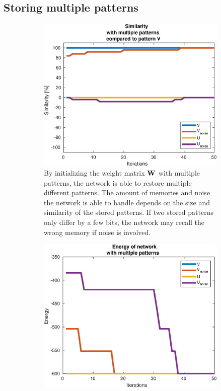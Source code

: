 \subsection{Storing multiple patterns}
\begin{figure}[H]
    \centering
    \captionsetup[subfigure]{width=0.9\textwidth, justification=raggedright}
    \begin{subfigure}{0.49\textwidth}
        \includegraphics[width=\textwidth]{figs/multiple-patterns.eps}
        \caption{By initializing the weight matrix $\bf W$ with multiple patterns, the network is able to restore multiple different patterns. The amount of memories and noise the network is able to handle depends on the size and similarity of the stored patterns. If two stored patterns only differ by a few bits, the network may recall the wrong memory if noise is involved. }
        \label{fig:multiple-similarity}
    \end{subfigure}
    \begin{subfigure}{0.49\textwidth}
        \includegraphics[width=\textwidth]{figs/multiple-patterns-energy.eps}

\end{subfigure}
\end{figure}
